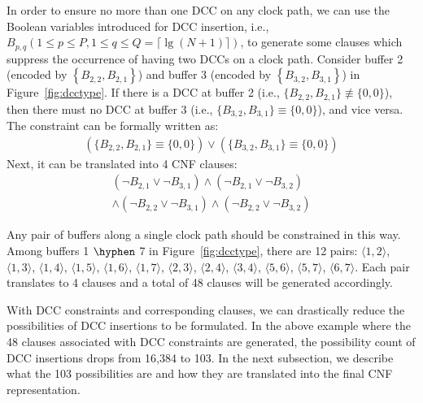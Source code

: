 In order to ensure no more than one DCC on any clock path, we can use the Boolean variables introduced for DCC insertion, i.e., $B_{p,q} \left(1 \leq p \leq P, 1 \leq q \leq Q = \lceil \lg (N + 1) \rceil \right)$, to generate some clauses which suppress the occurrence of having two DCCs on a clock path. Consider buffer 2 (encoded by $\left\{B_{2,2}, B_{2,1}\right\}$) and buffer 3 (encoded by $\left\{B_{3,2}, B_{3,1}\right\}$) in Figure~\ref{fig:dcctype}. If there is a DCC at buffer 2 (i.e., $\{B_{2,2}, B_{2,1}\} \not\equiv \{0, 0\}$), then there must no DCC at buffer 3 (i.e., $\{B_{3,2}, B_{3,1}\} \equiv \{0, 0\}$), and vice versa. The constraint can be formally written as:
\begin{gather*}
\left(\{B_{2,2}, B_{2,1}\} \equiv \{0, 0\}\right) \lor \left(\{B_{3,2}, B_{3,1}\} \equiv \{0, 0\}\right)
\end{gather*}
Next, it can be translated into 4 CNF clauses:
\begin{equation*}
\begin{split}
(\neg B_{2,1}\lor\neg B_{3,1}) \land (\neg B_{2,1}\lor\neg B_{3,2}) \\
\land (\neg B_{2,2}\lor\neg B_{3,1}) \land (\neg B_{2,2}\lor\neg B_{3,2})
\end{split}
\end{equation*}

Any pair of buffers along a single clock path should be constrained in this way. Among buffers 1 $\hyphen$ 7 in Figure~\ref{fig:dcctype}, there are 12 pairs: $\langle1, 2\rangle$, $\langle1, 3\rangle$, $\langle1, 4\rangle$, $\langle1, 5\rangle$, $\langle1, 6\rangle$, $\langle1, 7\rangle$, $\langle2, 3\rangle$, $\langle2, 4\rangle$, $\langle3, 4\rangle$, $\langle5, 6\rangle$, $\langle5, 7\rangle$, $\langle6, 7\rangle$. Each pair translates to 4 clauses and a total of 48 clauses will be generated accordingly.

With DCC constraints and corresponding clauses, we can drastically reduce the possibilities of DCC insertions to be formulated. In the above example where the 48 clauses associated with DCC constraints are generated, the possibility count of DCC insertions drops from 16,384 to 103. In the next subsection, we describe what the 103 possibilities are and how they are translated into the final CNF representation.
